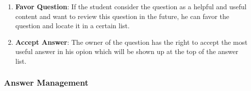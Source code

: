 \begin{enumerate}
\item
\textbf{Favor Question}: If the student consider the question as a helpful and useful content and want to review this question in the future, he can favor the question and locate it in a certain list.


\item
\textbf{Accept Answer}: The owner of the question has the right to accept the most useful answer in his opion which will be shown up at the top of the answer list.


\end{enumerate}

\subsubsection{Answer Management}

